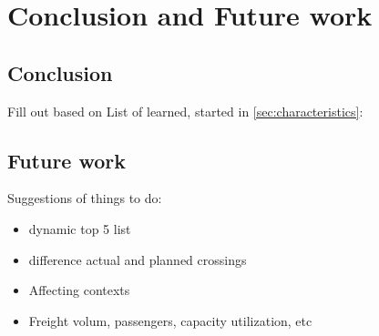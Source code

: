 \chapter{Conclusion and Future work}
\label{chapter:conclusion}

\section{Conclusion} %
\label{sec:conclusion}
Fill out based on List of learned, started in \ref{sec:characteristics}:

\section{Future work} %
\label{sec:future_work}

Suggestions of things to do:
\begin{itemize}
	\item dynamic top 5 list
	\item difference actual and planned crossings
	\item Affecting contexts
	\item Freight volum, passengers, capacity utilization, etc
\end{itemize}


